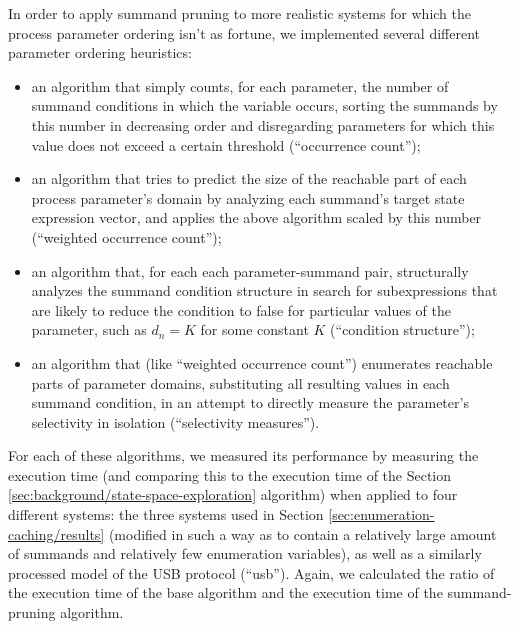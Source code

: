 \documentclass[a4paper]{article}
\begin{document}
In order to apply summand pruning to more realistic systems for which the process parameter ordering isn't as fortune, we implemented several different parameter ordering heuristics:
\begin{itemize}
 \item an algorithm that simply counts, for each parameter, the number of summand conditions in which the variable occurs, sorting the summands by this number in decreasing order and disregarding parameters for which this value does not exceed a certain threshold (``occurrence count'');
 \item an algorithm that tries to predict the size of the reachable part of each process parameter's domain by analyzing each summand's target state expression vector, and applies the above algorithm scaled by this number (``weighted occurrence count'');
 \item an algorithm that, for each each parameter-summand pair, structurally analyzes the summand condition structure in search for subexpressions that are likely to reduce the condition to \textsf{false} for particular values of the parameter, such as $d_n = K$ for some constant $K$ (``condition structure'');
 \item an algorithm that (like ``weighted occurrence count'') enumerates reachable parts of parameter domains, substituting all resulting values in each summand condition, in an attempt to directly measure the parameter's selectivity in isolation (``selectivity measures'').
\end{itemize}

For each of these algorithms, we measured its performance by measuring the execution time (and comparing this to the execution time of the Section \ref{sec:background/state-space-exploration} algorithm) when applied to four different systems: the three systems used in Section \ref{sec:enumeration-caching/results} (modified in such a way as to contain a relatively large amount of summands and relatively few enumeration variables), as well as a similarly processed model of the USB protocol (``usb''). Again, we calculated the ratio of the execution time of the base algorithm and the execution time of the summand-pruning algorithm.
\end{document}
